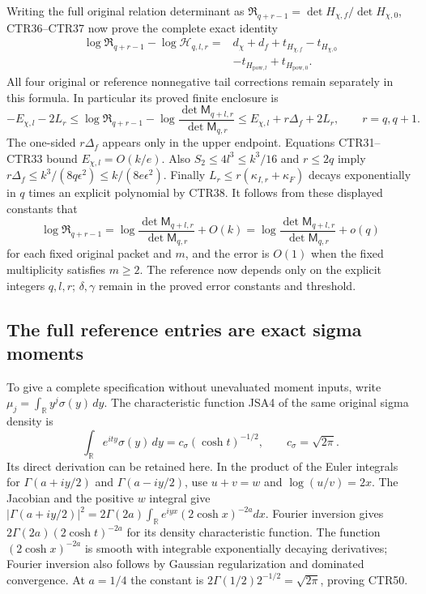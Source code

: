 \documentclass[11pt,a4paper]{article}
\begin{document}
Writing the full original relation determinant as
$\mathfrak R_{q+r-1}=\det H_{\chi,f}/\det H_{\chi,0}$,
CTR36--CTR37 now prove the complete exact identity
\[
 \begin{split}
 \log\mathfrak R_{q+r-1}-\log\mathcal H_{q,l,r}
   ={}&d_\chi+d_f
       +t_{H_{\chi,f}}-t_{H_{\chi,0}}\\
      &-t_{H_{\mathrm{pow},l}}+t_{H_{\mathrm{pow},0}} .
 \end{split}
 \tag{CTR47}
\]
All four original or reference nonnegative tail corrections remain
separately in this formula. In particular its proved finite enclosure is
\[
 \boxed{
 -E_{\chi,l}-2L_r
 \leq\log\mathfrak R_{q+r-1}
       -\log\frac{\det\mathsf M_{q+l,r}}{\det\mathsf M_{q,r}}
 \leq E_{\chi,l}+r\Delta_f+2L_r,\qquad r=q,q+1.}
 \tag{CTR48}
\]
The one-sided $r\Delta_f$ appears only in the upper endpoint.
Equations CTR31--CTR33 bound $E_{\chi,l}=O(k/e)$.
Also $S_2\leq4l^3\leq k^3/16$ and $r\leq2q$ imply
$r\Delta_f\leq k^3/(8q\epsilon^2)\leq k/(8e\epsilon^2)$.
Finally $L_r\leq r(\kappa_{I,r}+\kappa_F)$ decays exponentially
in $q$ times an explicit polynomial by CTR38.
It follows from these displayed constants that
\[
 \log\mathfrak R_{q+r-1}
   =\log\frac{\det\mathsf M_{q+l,r}}{\det\mathsf M_{q,r}}
       +O(k)=
     \log\frac{\det\mathsf M_{q+l,r}}{\det\mathsf M_{q,r}}+o(q)
 \tag{CTR49}
\]
for each fixed original packet and $m$, and the error is $O(1)$
when the fixed multiplicity satisfies $m\geq2$.
The reference now depends only on the explicit integers $q,l,r$;
$\delta,\gamma$ remain in the proved error constants and threshold.

\subsection{The full reference entries are exact sigma moments}
To give a complete specification without unevaluated moment inputs,
write $\mu_j=\int_{\mathbb R}y^j\sigma(y)\,dy$.
The characteristic function JSA4 of the same original sigma density is
\[
 \int_{\mathbb R}e^{ity}\sigma(y)\,dy
    =c_\sigma(\cosh t)^{-1/2},\qquad c_\sigma=\sqrt{2\pi}.
 \tag{CTR50}
\]
Its direct derivation can be retained here. In the product of the Euler
integrals for $\Gamma(a+iy/2)$ and $\Gamma(a-iy/2)$, use
$u+v=w$ and $\log(u/v)=2x$. The Jacobian and the positive $w$ integral
give
$|\Gamma(a+iy/2)|^2
=2\Gamma(2a)\int_{\mathbb R}e^{iyx}(2\cosh x)^{-2a}dx$.
Fourier inversion gives
$2\Gamma(2a)(2\cosh t)^{-2a}$ for its density characteristic function.
The function $(2\cosh x)^{-2a}$ is smooth with integrable exponentially
decaying derivatives; Fourier inversion also follows by Gaussian
regularization and dominated convergence. At $a=1/4$ the constant is
$2\Gamma(1/2)2^{-1/2}=\sqrt{2\pi}$, proving CTR50.
\end{document}
